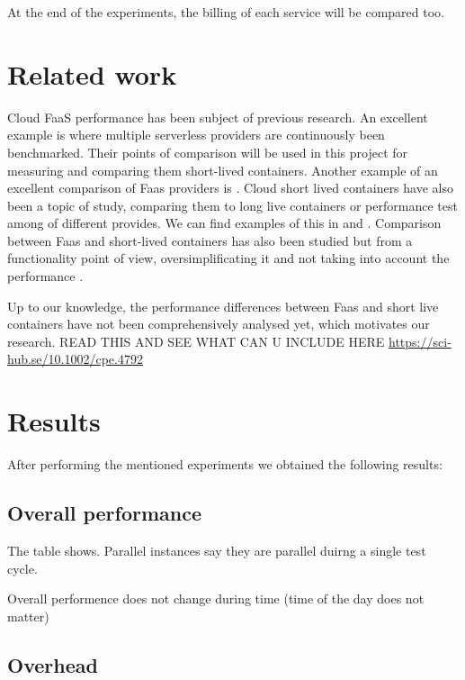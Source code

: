 \documentclass[11pt]{article}
\begin{document}
At the end of the experiments, the billing of each service will be compared too.






\section{Related work}
Cloud FaaS performance has been subject of previous research. An excellent example is \cite{aa} where multiple serverless providers are continuously been benchmarked. Their points of comparison will be used in this project for measuring and comparing them short-lived containers. Another example of an excellent comparison of Faas providers is \cite{bb}. Cloud short lived containers have also been a topic of study, comparing them to long live containers or performance test among of different provides. We can find examples of this in \cite{cc} and \cite{dd}. Comparison between Faas and short-lived containers has also been studied but from a functionality point of view, oversimplificating it and not taking into account the performance \cite{ee}\cite{ff}\cite{gg}.

Up to our knowledge, the performance differences between Faas and short live containers have not been comprehensively analysed yet, which motivates our research.
READ THIS AND SEE WHAT CAN U INCLUDE HERE
\url{https://sci-hub.se/10.1002/cpe.4792}


\section{Results}
After performing the mentioned experiments we obtained the following results:

\subsection{Overall performance}

The table shows. Parallel instances say they are parallel duirng a single test cycle. 

Overall performence does not change during time (time of the day does not matter)

\subsection{Overhead}
\end{document}
